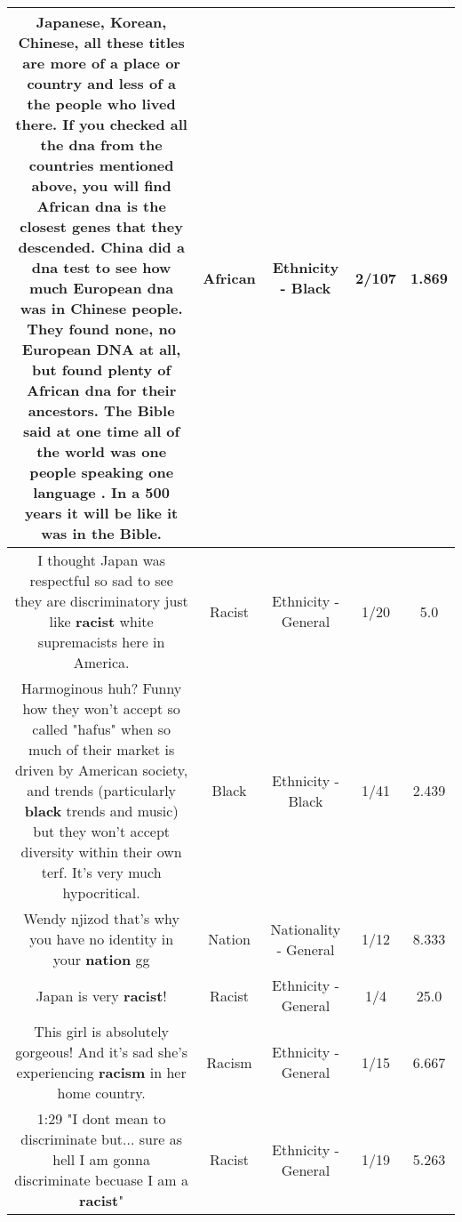 \documentclass[11pt]{article}
\newlength\mylength
\begin{document}
\begin{center}
\begin{longtable}{|C{.65\mylength}|C{.30\mylength}|C{.12\mylength}|C{.12\mylength}|C{.12\mylength}|}
  \small Japanese, Korean, Chinese, all these titles are more of a place or country and less of a the people who lived there. If you checked all the dna from the countries mentioned above, you will find \textbf{African} dna is the closest genes that they descended. China did a dna test to see how much European dna was in Chinese people.  They found none, no European DNA at all, but found plenty of \textbf{African} dna for their ancestors.  The Bible said at one time all of the world was one people speaking one language . In a 500 years it will be like it was in the Bible.\normalsize   & African & Ethnicity - Black & 2/107 & 1.869 \\  \hline
  \small I thought Japan was respectful so sad to see they are discriminatory just like \textbf{racist} white supremacists here in America.\normalsize   & Racist & Ethnicity - General & 1/20 & 5.0 \\  \hline
  \small Harmoginous huh? Funny how they won't accept so called "hafus" when so much of their market is driven by American society, and trends (particularly \textbf{black} trends and music) but they won't accept diversity within their own terf. It's very much hypocritical.\normalsize   & Black & Ethnicity - Black & 1/41 & 2.439 \\  \hline
  \small Wendy njizod that's why you have no identity in your \textbf{nation} gg\normalsize   & Nation & Nationality - General & 1/12 & 8.333 \\  \hline
  \small Japan is very \textbf{racist}!\normalsize   & Racist & Ethnicity - General & 1/4 & 25.0 \\  \hline
  \small This girl is absolutely gorgeous! And it's sad she's experiencing \textbf{racism} in her home country.\normalsize   & Racism & Ethnicity - General & 1/15 & 6.667 \\  \hline
  \small 1:29 "I dont mean to discriminate but... sure as hell I am gonna discriminate becuase I am a \textbf{racist}"\normalsize   & Racist & Ethnicity - General & 1/19 & 5.263 \\  \hline

\end{longtable}
\end{center}
\end{document}

